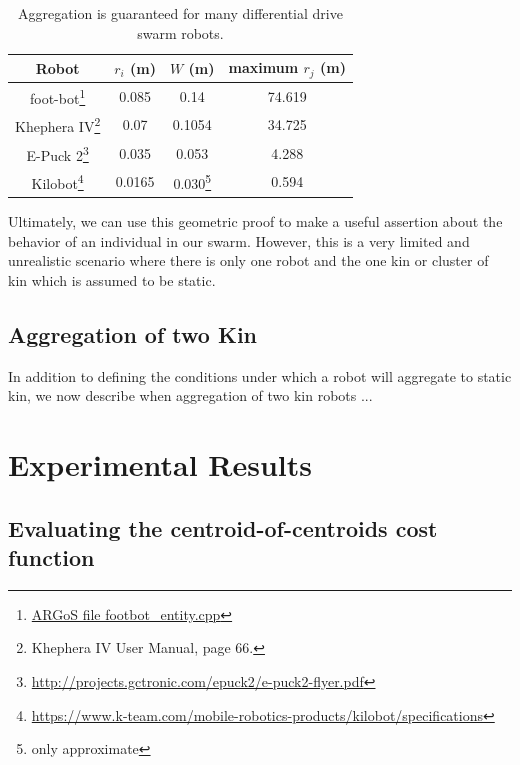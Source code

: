 \documentclass[conference]{IEEEtran}
\begin{document}
    \begin{savenotes}
    \begin{table}
      \centering
      \caption{Aggregation is guaranteed for many differential drive swarm robots.}
      \begin{tabular}{|c|c|c|c|} \hline
        Robot & $r_i$ (m) & $W$ (m) & maximum $r_j$ (m) \\ \hline
        foot-bot\footnote{\href{https://github.com/ilpincy/argos3/blob/master/src/plugins/robots/foot-bot/simulator/footbot_entity.cpp}{ARGoS file footbot\_entity.cpp}} &
            0.085 & 0.14 & 74.619 \\ \hline
        Khephera IV\footnote{Khephera IV User Manual, page 66.} &
            0.07 & 0.1054 & 34.725 \\ \hline
        E-Puck 2\footnote{\href{http://projects.gctronic.com/epuck2/e-puck2-flyer.pdf}{http://projects.gctronic.com/epuck2/e-puck2-flyer.pdf}} &
            0.035 & 0.053 & 4.288 \\ \hline
        Kilobot\footnote{\href{https://www.k-team.com/mobile-robotics-products/kilobot/specifications}{https://www.k-team.com/mobile-robotics-products/kilobot/specifications}} &
            0.0165 & 0.030\footnote{only approximate} & 0.594 \\ \hline
      \end{tabular}
      \label{table:robots}
    \end{table}
    \end{savenotes}

    Ultimately, we can use this geometric proof to make a useful assertion about the behavior of an individual in our swarm. However, this is a very limited and unrealistic scenario where there is only one robot and the one kin or cluster of kin which is assumed to be static.

  \subsection{Aggregation of two Kin}

    In addition to defining the conditions under which a robot will aggregate to static kin, we now describe when aggregation of two kin robots ...

\section{Experimental Results}

  \subsection{Evaluating the centroid-of-centroids cost function} \label{section:evaluting_cost_functions}
\end{document}
